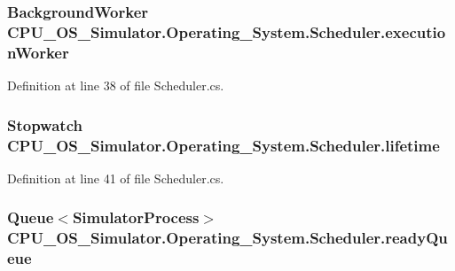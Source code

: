 \subsubsection[{execution\+Worker}]{\setlength{\rightskip}{0pt plus 5cm}Background\+Worker C\+P\+U\+\_\+\+O\+S\+\_\+\+Simulator.\+Operating\+\_\+\+System.\+Scheduler.\+execution\+Worker\hspace{0.3cm}{\ttfamily [private]}}\label{class_c_p_u___o_s___simulator_1_1_operating___system_1_1_scheduler_a8b68cea278d24fcc12c6721210fe8dcb}


Definition at line 38 of file Scheduler.\+cs.

\hypertarget{class_c_p_u___o_s___simulator_1_1_operating___system_1_1_scheduler_a765eabf93b7584d7d1476d18f283a85e}{}
\subsubsection[{lifetime}]{\setlength{\rightskip}{0pt plus 5cm}Stopwatch C\+P\+U\+\_\+\+O\+S\+\_\+\+Simulator.\+Operating\+\_\+\+System.\+Scheduler.\+lifetime\hspace{0.3cm}{\ttfamily [private]}}\label{class_c_p_u___o_s___simulator_1_1_operating___system_1_1_scheduler_a765eabf93b7584d7d1476d18f283a85e}


Definition at line 41 of file Scheduler.\+cs.

\hypertarget{class_c_p_u___o_s___simulator_1_1_operating___system_1_1_scheduler_a6583fdeac6a6c0cc5be94ae0f280eaf2}{}
\subsubsection[{ready\+Queue}]{\setlength{\rightskip}{0pt plus 5cm}Queue$<${\bf Simulator\+Process}$>$ C\+P\+U\+\_\+\+O\+S\+\_\+\+Simulator.\+Operating\+\_\+\+System.\+Scheduler.\+ready\+Queue\hspace{0.3cm}{\ttfamily [private]}}\label{class_c_p_u___o_s___simulator_1_1_operating___system_1_1_scheduler_a6583fdeac6a6c0cc5be94ae0f280eaf2}



